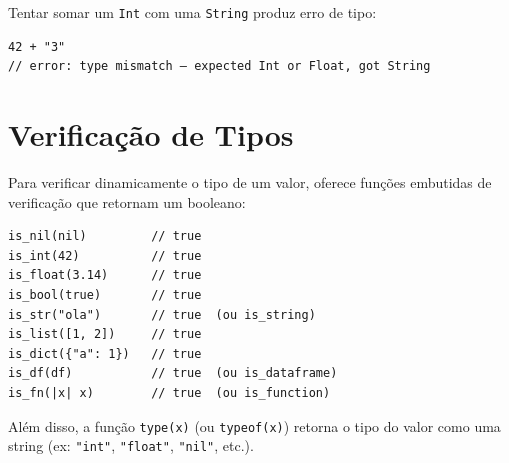 Tentar somar um \texttt{Int} com uma \texttt{String} produz erro de tipo:

\begin{lstlisting}
42 + "3"
// error: type mismatch — expected Int or Float, got String
\end{lstlisting}

\section{Verificação de Tipos}

Para verificar dinamicamente o tipo de um valor, \hayashi{} oferece funções embutidas de verificação que retornam um booleano:

\begin{lstlisting}
is_nil(nil)         // true
is_int(42)          // true
is_float(3.14)      // true
is_bool(true)       // true
is_str("ola")       // true  (ou is_string)
is_list([1, 2])     // true
is_dict({"a": 1})   // true
is_df(df)           // true  (ou is_dataframe)
is_fn(|x| x)        // true  (ou is_function)
\end{lstlisting}

Além disso, a função \lstinline{type(x)} (ou \lstinline{typeof(x)}) retorna o tipo do valor como uma string (ex: \lstinline{"int"}, \lstinline{"float"}, \lstinline{"nil"}, etc.).
